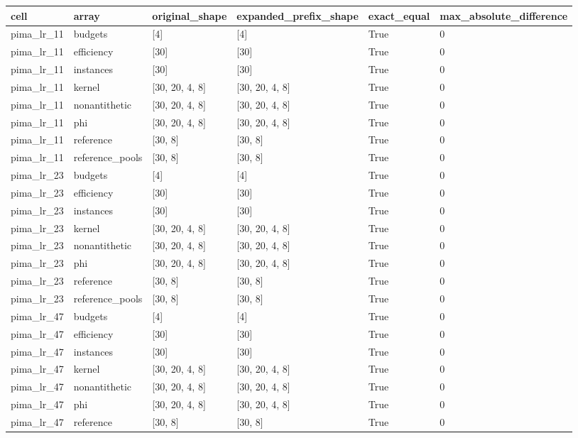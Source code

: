 \begin{tabular}{llllll}
\toprule
cell & array & original\_shape & expanded\_prefix\_shape & exact\_equal & max\_absolute\_difference \\
\midrule
pima\_lr\_11 & budgets & [4] & [4] & True & 0 \\
pima\_lr\_11 & efficiency & [30] & [30] & True & 0 \\
pima\_lr\_11 & instances & [30] & [30] & True & 0 \\
pima\_lr\_11 & kernel & [30, 20, 4, 8] & [30, 20, 4, 8] & True & 0 \\
pima\_lr\_11 & nonantithetic & [30, 20, 4, 8] & [30, 20, 4, 8] & True & 0 \\
pima\_lr\_11 & phi & [30, 20, 4, 8] & [30, 20, 4, 8] & True & 0 \\
pima\_lr\_11 & reference & [30, 8] & [30, 8] & True & 0 \\
pima\_lr\_11 & reference\_pools & [30, 8] & [30, 8] & True & 0 \\
pima\_lr\_23 & budgets & [4] & [4] & True & 0 \\
pima\_lr\_23 & efficiency & [30] & [30] & True & 0 \\
pima\_lr\_23 & instances & [30] & [30] & True & 0 \\
pima\_lr\_23 & kernel & [30, 20, 4, 8] & [30, 20, 4, 8] & True & 0 \\
pima\_lr\_23 & nonantithetic & [30, 20, 4, 8] & [30, 20, 4, 8] & True & 0 \\
pima\_lr\_23 & phi & [30, 20, 4, 8] & [30, 20, 4, 8] & True & 0 \\
pima\_lr\_23 & reference & [30, 8] & [30, 8] & True & 0 \\
pima\_lr\_23 & reference\_pools & [30, 8] & [30, 8] & True & 0 \\
pima\_lr\_47 & budgets & [4] & [4] & True & 0 \\
pima\_lr\_47 & efficiency & [30] & [30] & True & 0 \\
pima\_lr\_47 & instances & [30] & [30] & True & 0 \\
pima\_lr\_47 & kernel & [30, 20, 4, 8] & [30, 20, 4, 8] & True & 0 \\
pima\_lr\_47 & nonantithetic & [30, 20, 4, 8] & [30, 20, 4, 8] & True & 0 \\
pima\_lr\_47 & phi & [30, 20, 4, 8] & [30, 20, 4, 8] & True & 0 \\
pima\_lr\_47 & reference & [30, 8] & [30, 8] & True & 0 \\

\end{tabular}
